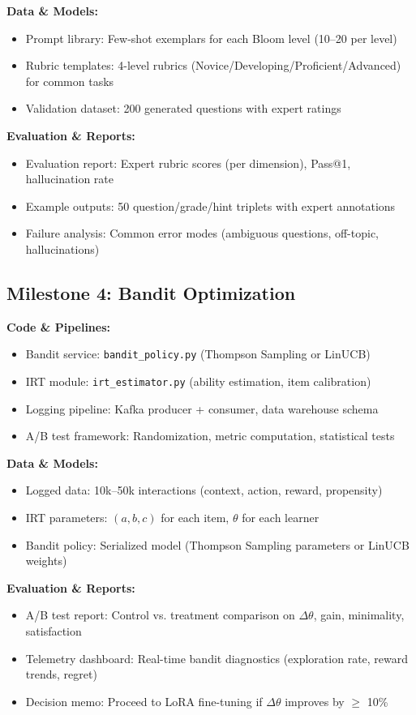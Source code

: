 \documentclass[11pt,letterpaper]{article}
\begin{document}
\textbf{Data \& Models:}
\begin{itemize}
\item Prompt library: Few-shot exemplars for each Bloom level (10--20 per level)
\item Rubric templates: 4-level rubrics (Novice/Developing/Proficient/Advanced) for common tasks
\item Validation dataset: 200 generated questions with expert ratings
\end{itemize}

\textbf{Evaluation \& Reports:}
\begin{itemize}
\item Evaluation report: Expert rubric scores (per dimension), Pass@1, hallucination rate
\item Example outputs: 50 question/grade/hint triplets with expert annotations
\item Failure analysis: Common error modes (ambiguous questions, off-topic, hallucinations)
\end{itemize}

\subsection{Milestone 4: Bandit Optimization}\label{subsec:deliverable-milestone-4}

\textbf{Code \& Pipelines:}
\begin{itemize}
\item Bandit service: \texttt{bandit\_policy.py} (Thompson Sampling or LinUCB)
\item IRT module: \texttt{irt\_estimator.py} (ability estimation, item calibration)
\item Logging pipeline: Kafka producer + consumer, data warehouse schema
\item A/B test framework: Randomization, metric computation, statistical tests
\end{itemize}

\textbf{Data \& Models:}
\begin{itemize}
\item Logged data: 10k--50k interactions (context, action, reward, propensity)
\item IRT parameters: $(a, b, c)$ for each item, $\theta$ for each learner
\item Bandit policy: Serialized model (Thompson Sampling parameters or LinUCB weights)
\end{itemize}

\textbf{Evaluation \& Reports:}
\begin{itemize}
\item A/B test report: Control vs. treatment comparison on $\Delta\theta$, gain, minimality, satisfaction
\item Telemetry dashboard: Real-time bandit diagnostics (exploration rate, reward trends, regret)
\item Decision memo: Proceed to LoRA fine-tuning if $\Delta\theta$ improves by $\geq$ 10\%
\end{itemize}
\end{document}
